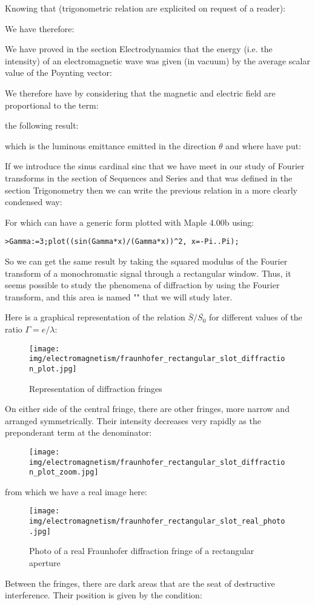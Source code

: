 	Knowing that (trigonometric relation are explicited on request of a reader):
	
	We have therefore:
	
	We have proved in the section Electrodynamics that the energy (i.e. the intensity) of an electromagnetic wave was given (in vacuum) by the average scalar value of the Poynting vector:
	
	We therefore have by considering that the magnetic and electric field are proportional to the term:
	
	the following result:
	
	which is the luminous emittance emitted in the direction $\theta$ and where have put:
	
	If we introduce the sinus cardinal sinc that we have meet in our study of Fourier transforms in the section of Sequences and Series and that was defined in the section Trigonometry then we can write the previous relation in a more clearly condensed way:
	
	For which can have a generic form plotted with Maple 4.00b using:
	
	\texttt{>Gamma:=3;plot((sin(Gamma*x)/(Gamma*x))\string^2, x=-Pi..Pi);}
	
	So we can get the same result by taking the squared modulus of the Fourier transform of a monochromatic signal through a rectangular window. Thus, it seems possible to study the phenomena of diffraction by using the Fourier transform, and this area is named "" that we will study later.
	
	Here is a graphical representation of the relation $\bar{S}/\overline{S_0}$ for different values of the ratio $\Gamma=e/\lambda$:
	\begin{figure}[H]
		\centering
		\texttt{[image: img/electromagnetism/fraunhofer\_rectangular\_slot\_diffraction\_plot.jpg]}
		\caption{Representation of diffraction fringes}
	\end{figure}
	On either side of the central fringe, there are other fringes, more narrow and arranged symmetrically. Their intensity decreases very rapidly as the preponderant  term at the denominator:
	
	\begin{figure}[H]
		\centering
		\texttt{[image: img/electromagnetism/fraunhofer\_rectangular\_slot\_diffraction\_plot\_zoom.jpg]}
	\end{figure}
	from which we have a real image here:
	\begin{figure}[H]
		\centering
		\texttt{[image: img/electromagnetism/fraunhofer\_rectangular\_slot\_real\_photo.jpg]}
		\caption{Photo of a real Fraunhofer diffraction fringe of a rectangular aperture}
	\end{figure}
	Between the fringes, there are dark areas that are the seat of destructive interference. Their position is given by the condition\label{destructive interference pattern}:
	

